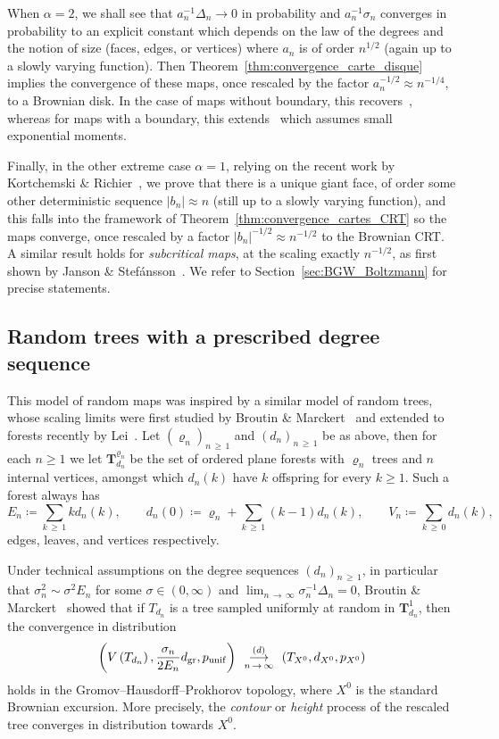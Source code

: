 \documentclass[10pt]{amsart}
\theoremstyle{definition}\newtheorem{defi}[theo]{Definition}\newtheorem{rema}[theo]{Remark}\newtheorem{exam}[theo]{Example}\newtheorem{exem}[theo]{Example}\newtheorem{nota}[theo]{Notation}
\newcommand{\1}{\ensembles{1}}
\newcommand{\Tree}{\mathbf{T}}
\renewcommand{\ge}{\geqslant}
\newcommand{\CRT}{T}
\newcommand{\dCRT}{d}
\newcommand{\pCRT}{p}
\newcommand{\dgr}{d_{\mathrm{gr}}}
\newcommand{\pgr}{p_{\mathrm{unif}}}
\newcommand{\tn}{T_{d_n}}
\newcommand{\edges}{E}
\newcommand{\vertices}{V}
\newcommand{\cvloi}[1][n]{\enskip\mathop{\longrightarrow}^{(d)}_{#1\,\to\, \infty}\enskip}
\providecommand{\?}{}
\begin{document}
When $\alpha=2$, we shall see that $a_n^{-1} \Delta_n \to 0$ in probability and $a_n^{-1} \sigma_n$ converges in probability to an explicit constant which depends on the law of the degrees and the notion of size (faces, edges, or vertices) where $a_n$ is of order $n^{1/2}$ (again up to a slowly varying function). Then Theorem~\ref{thm:convergence_carte_disque} implies the convergence of these maps, once rescaled by the factor $a_n^{-1/2} \approx n^{-1/4}$, to a Brownian disk. In the case of maps without boundary, this recovers~\cite[Theorem~1]{Mar18a}, whereas for maps with a boundary, this extends~\cite[Theorem~5]{BM17} which assumes small exponential moments.

Finally, in the other extreme case $\alpha=1$, relying on the recent work by Kortchemski \& Richier~\cite{KR19}, we prove that there is a unique giant face, of order some other deterministic sequence $|b_n| \approx n$ (still up to a slowly varying function), and this falls into the framework of Theorem~\ref{thm:convergence_cartes_CRT} so the maps converge, once rescaled by a factor $|b_n|^{-1/2} \approx n^{-1/2}$ to the Brownian CRT. A similar result holds for \emph{subcritical maps}, at the scaling exactly $n^{-1/2}$, as first shown by Janson \& Stefánsson~\cite{JS15}. We refer to Section~\ref{sec:BGW_Boltzmann} for precise statements.



\subsection{Random trees with a prescribed degree sequence}\label{sec:intro_arbres}

This model of random maps was inspired by a similar model of random trees, whose scaling limits were first studied by Broutin \& Marckert~\cite{BM14} and extended to forests recently by Lei~\cite{Lei19}. Let $(\varrho_n)_{n\,\ge\,1}$ and $(d_n)_{n\,\ge\, 1}$ be as above, then for each $n \ge 1$ we let $\Tree_{d_n}^{\varrho_n}$ be the set of ordered plane forests with $\varrho_n$ trees and $n$ internal vertices, amongst which $d_n(k)$ have $k$ offspring for every $k \ge 1$. Such a forest always has
\[
\edges_n \coloneqq \sum_{k\,\ge\,1} k d_n(k),
\qquad d_n(0) \coloneqq \varrho_n + \sum_{k\, \ge\,1} (k-1) d_n(k),
\qquad
\vertices_n \coloneqq \sum_{k\,\ge\,0} d_n(k),
\]
edges, leaves, and vertices respectively.


Under technical assumptions on the degree sequences $(d_n)_{n\,\ge\,1}$, in particular that $\sigma_n^2 \sim \sigma^2 E_n$ for some $\sigma \in (0,\infty)$ and $\lim_{n\,\to \,\infty} \sigma_n^{-1} \Delta_n = 0$, Broutin \& Marckert~\cite{BM14} showed that if $\tn$ is a tree sampled uniformly at random in $\Tree_{d_n}^1$, then the convergence in distribution
\begin{equation}\label{eq:convergence_arbres_BM}
\left(V\left(\tn\right), \frac{\sigma_n}{2 \edges_n} \dgr, \pgr\right) \cvloi \left(\CRT_{X^0}, \dCRT_{X^0}, \pCRT_{X^0}\right)
\end{equation}
holds in the Gromov--Hausdorff--Prokhorov topology, where $X^0$ is the standard Brownian excursion. More precisely, the \emph{contour} or \emph{height} process of the rescaled tree converges in distribution towards $X^{0}$.
\end{document}
